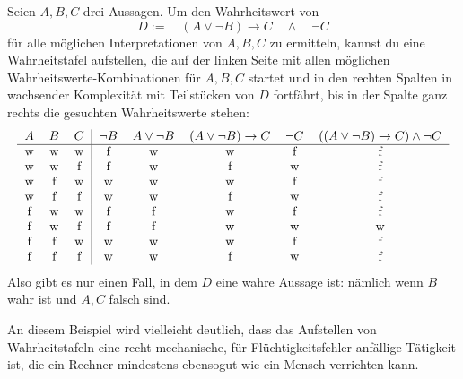 \begin{bsp}
    Seien $A,B,C$ drei Aussagen. Um den Wahrheitswert von
        \[ D:= \quad (A\lor \neg B) \to C\quad \land\quad \neg C\]
    für alle möglichen Interpretationen von $A,B,C$ zu ermitteln, kannst du eine Wahrheitstafel aufstellen, die auf der linken Seite mit allen möglichen Wahrheitswerte-Kombinationen für $A,B,C$ startet und in den rechten Spalten in wachsender Komplexität mit Teilstücken von $D$ fortfährt, bis in der Spalte ganz rechts die gesuchten Wahrheitswerte stehen:
    \[\begin{tabular}{ccc|ccccc}
        $A$ & $B$ & $C$ & $\neg B$ & $A\lor \neg B$ & $(A\lor \neg B)\to C$ & $\neg C$ & $((A\lor \neg B) \to C)\land \neg C$ \\
        \hline
        w & w & w &  f & w & w & f & f \\
        w & w & f &  f & w & f & w & f \\
        w & f & w &  w & w & w & f & f \\
        w & f & f &  w & w & f & w & f \\
        f & w & w &  f & f & w & f & f \\
        f & w & f &  f & f & w & w & w \\
        f & f & w &  w & w & w & f & f \\
        f & f & f &  w & w & f & w & f
    \end{tabular}\]
    Also gibt es nur einen Fall, in dem $D$ eine wahre Aussage ist: nämlich wenn $B$ wahr ist und $A,C$ falsch sind.
    
    An diesem Beispiel wird vielleicht deutlich, dass das Aufstellen von Wahrheitstafeln eine recht mechanische, für Flüchtigkeitsfehler anfällige Tätigkeit ist, die ein Rechner mindestens ebensogut wie ein Mensch verrichten kann.
\end{bsp}


